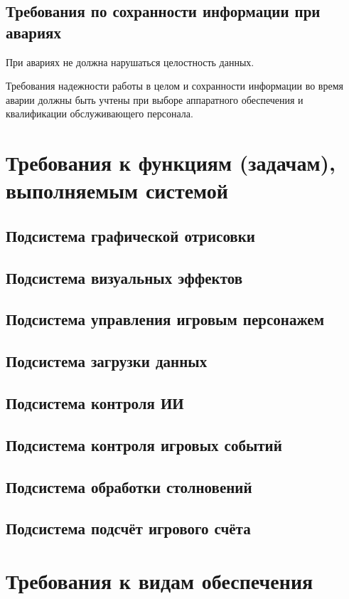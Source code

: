\subsection{Требования по сохранности информации при авариях}
При авариях не должна нарушаться целостность данных. 

Требования надежности работы в целом и сохранности информации во время аварии должны быть 
учтены при выборе аппаратного обеспечения и квалификации обслуживающего персонала.

\section{Требования к функциям (задачам), выполняемым системой}
\subsection{Подсистема графической отрисовки}
\subsection{Подсистема визуальных эффектов}
\subsection{Подсистема управления игровым персонажем}
\subsection{Подсистема загрузки данных}
\subsection{Подсистема контроля ИИ}
\subsection{Подсистема контроля игровых событий}
\subsection{Подсистема обработки столновений}
\subsection{Подсистема подсчёт игрового счёта}

\section{Требования к видам обеспечения}

